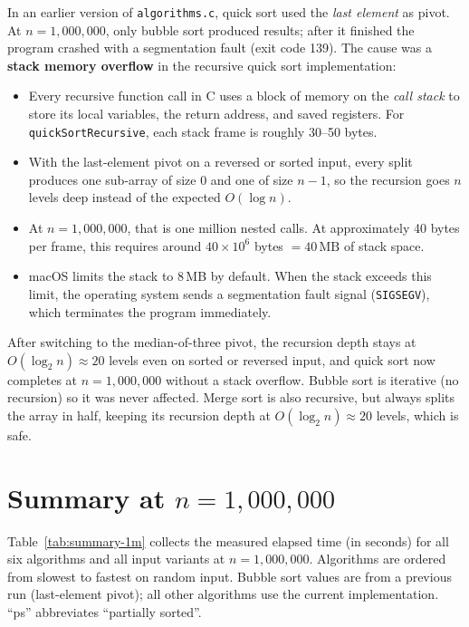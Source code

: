 \documentclass[11pt,a4paper]{article}
\begin{document}
In an earlier version of \texttt{algorithms.c}, quick sort used the \emph{last element} as pivot. At \(n=1{,}000{,}000\), only bubble sort produced results; after it finished the program crashed with a segmentation fault (exit code 139). The cause was a \textbf{stack memory overflow} in the recursive quick sort implementation:

\begin{itemize}
    \item Every recursive function call in C uses a block of memory on the \emph{call stack} to store its local variables, the return address, and saved registers. For \texttt{quickSortRecursive}, each stack frame is roughly 30--50 bytes.
    \item With the last-element pivot on a reversed or sorted input, every split produces one sub-array of size 0 and one of size \(n-1\), so the recursion goes \(n\) levels deep instead of the expected \(O(\log n)\).
    \item At \(n = 1{,}000{,}000\), that is one million nested calls. At approximately 40 bytes per frame, this requires around \(40 \times 10^6\) bytes \(= 40\,\text{MB}\) of stack space.
    \item macOS limits the stack to 8\,MB by default. When the stack exceeds this limit, the operating system sends a segmentation fault signal (\texttt{SIGSEGV}), which terminates the program immediately.
\end{itemize}

After switching to the median-of-three pivot, the recursion depth stays at \(O(\log_2 n) \approx 20\) levels even on sorted or reversed input, and quick sort now completes at \(n=1{,}000{,}000\) without a stack overflow. Bubble sort is iterative (no recursion) so it was never affected. Merge sort is also recursive, but always splits the array in half, keeping its recursion depth at \(O(\log_2 n) \approx 20\) levels, which is safe.

\section{Summary at \(n=1{,}000{,}000\)}

Table~\ref{tab:summary-1m} collects the measured elapsed time (in seconds) for all six algorithms and all input variants at \(n=1{,}000{,}000\). Algorithms are ordered from slowest to fastest on random input. Bubble sort values are from a previous run (last-element pivot); all other algorithms use the current implementation. ``ps'' abbreviates ``partially sorted''.
\end{document}
